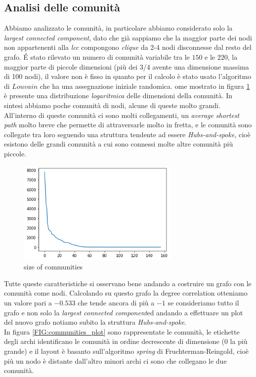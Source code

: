 \documentclass[a4paper]{article}
\newcommand{\lcc}{\textit{largest connected component}}
\begin{document}
\subsection{Analisi delle comunità}
Abbiamo analizzato le comunità, in particolare abbiamo considerato solo la \lcc, dato che già sappiamo che la maggior parte dei nodi non appartenenti alla \textit{lcc} compongono \textit{clique} da 2-4 nodi disconnesse dal resto del grafo.
É stato rilevato un numero di comunità variabile tra le $150 \text{ e le } 220$, la maggior parte di piccole dimensioni (più dei 3/4 avente una dimensione massima di 100 nodi), il valore non è fisso in quanto per il calcolo è stato usato l'algoritmo di $Louvain$ che ha una assegnazione iniziale randomica.
ome mostrato in figura \ref{FIG:communities_sizes} è presente una distribuzione \textit{logaritmica} delle dimensioni della comunità.
In sintesi abbiamo poche comunità di nodi, alcune di queste molto grandi.
All'interno di queste comunità ci sono molti collegamenti, un \textit{average shortest path} molto breve che permette di attraversarle molto in fretta, e le comunità sono collegate tra loro seguendo una struttura tendente ad essere \textit{Hubs-and-spoke}, cioè esistono delle grandi comunità a cui sono connessi molte altre comunità più piccole. \\
\begin{figure}[!ht]
\centering
\includegraphics[width=0.7\textwidth]{community_size.png}
\caption{size of communities} \label{FIG:communities_sizes}
\end{figure}
Tutte queste caratteristiche si osservano bene andando a costruire un grafo con le comunità come nodi.
Calcolando su questo grafo la degree correlation otteniamo un valore pari a $-0.533$ che tende ancora di più a $-1$ se consideriamo tutto il grafo e non solo la \lcc ed andando a effettuare un plot del nuovo grafo notiamo subito la struttura \textit{Hubs-and-spoke}. \\
In figura \ref{FIG:communities_plot} sono rappresentate le comunità, le etichette degli archi identificano le comunità in ordine decrescente di dimensione (0 la più grande) e il layout è basanto sull'algoritmo \textit{spring} di Fruchterman-Reingold, cioè più un nodo è distante dall'altro minori archi ci sono che collegano le due comunità.\\
\end{document}
